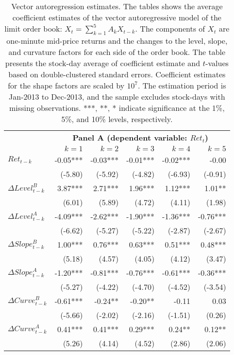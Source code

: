 	\begin{table}[p]
		\small
		\linespread{1}
		\centering
		\begin{tabular}{lrrrrr}
		\toprule
		& \multicolumn{5}{c}{\textbf{Panel A (dependent variable: $Ret_t$)}} \\
		\cmidrule(l{2pt}r{2pt}){2-6}
		& $k=1$ & $k=2$ & $k=3$ & $k=4$ & $k=5$ \\
		\midrule
		$Ret_{t-k}$ 			& -0.05*** & -0.03*** & -0.01*** & -0.02*** & -0.00 \\
								& (-5.80) & (-5.92) & (-4.82) & (-6.93) & (-0.91) \\
		$\Delta Level^B_{t-k}$ 	& 3.87*** & 2.71*** & 1.96*** & 1.12*** & 1.01** \\ %
								& (6.01) & (5.89) & (4.72) & (4.11) & (1.98) \\
		$\Delta Level^A_{t-k}$ 	& -4.09*** & -2.62*** & -1.90*** & -1.36*** & -0.76*** \\ %
								& (-6.62) & (-5.27) & (-5.22) & (-2.87) & (-2.67) \\
		$\Delta Slope^B_{t-k}$	& 1.00*** & 0.76*** & 0.63*** & 0.51*** & 0.48*** \\ %
								& (5.18) & (4.57) & (4.05) & (4.12) & (3.47) \\
		$\Delta Slope^A_{t-k}$ 	& -1.20*** & -0.81*** & -0.76*** & -0.61*** & -0.36*** \\ %
								& (-5.27) & (-4.22) & (-4.70) & (-4.52) & (-3.54) \\
		$\Delta Curve^B_{t-k}$ 	& -0.61*** & -0.24** & -0.20** & -0.11 & 0.03 \\ %
								& (-5.66) & (-2.02) & (-2.16) & (-1.51) & (0.26) \\
		$\Delta Curve^A_{t-k}$ 	& 0.41*** & 0.41*** & 0.29*** & 0.24** & 0.12** \\ %
								& (5.26) & (4.14) & (4.52) & (2.86) & (2.06) \\
		\bottomrule
		\end{tabular}
		\captionsetup{position=below, font=footnotesize, justification=justified, width=0.75\linewidth}
		\caption[Vector autoregression estimates]{Vector autoregression estimates. The tables shows the average coefficient estimates of the vector autoregressive model of the limit order book: $X_t = \sum_{k=1}^{5} A_{k} X_{t-k}.$ The components of $X_t$ are one-minute mid-price returns and the changes to the level, slope, and curvature factors for each side of the order book. The table presents the stock-day average of coefficient estimate and $t$-values based on double-clustered standard errors. Coefficient estimates for the shape factors are scaled by $10^7$. The estimation period is Jan-2013 to Dec-2013, and the sample excludes stock-days with missing observations. ***, **, * indicate significance at the 1\%, 5\%, and 10\% levels, respectively.}
		\label{tab:var}
	\end{table}


